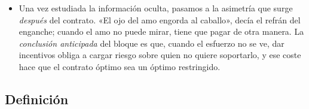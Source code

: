 \documentclass[11pt]{article}
\begin{document}
\begin{itemize}
\item Una vez estudiada la información oculta, pasamos a la asimetría que surge \emph{después} del contrato. «El ojo del amo engorda al caballo», decía el refrán del enganche; cuando el amo no puede mirar, tiene que pagar de otra manera. La \emph{conclusión anticipada} del bloque es que, cuando el esfuerzo no se ve, dar incentivos obliga a cargar riesgo sobre quien no quiere soportarlo, y ese coste hace que el contrato óptimo sea un óptimo restringido.
\end{itemize}

\subsection{Definición}\label{sec:definicion-rm}
\end{document}
